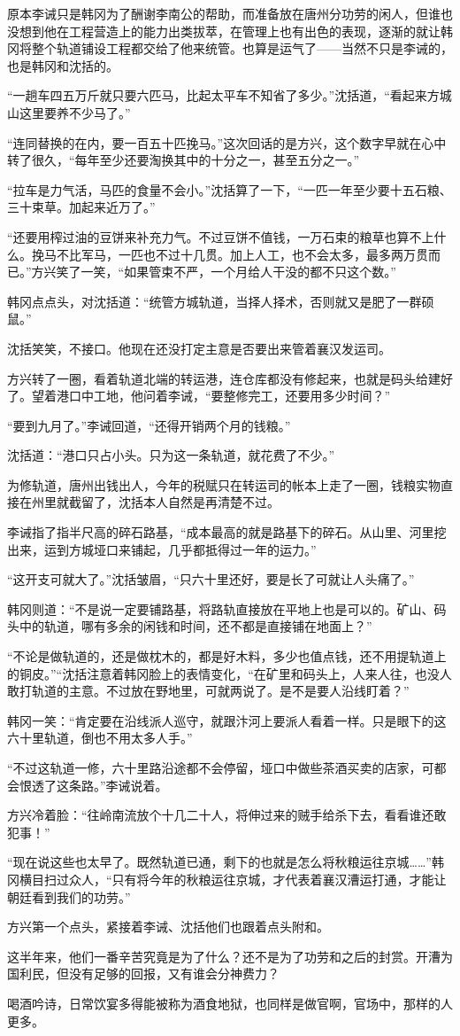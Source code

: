 原本李诫只是韩冈为了酬谢李南公的帮助，而准备放在唐州分功劳的闲人，但谁也没想到他在工程营造上的能力出类拔萃，在管理上也有出色的表现，逐渐的就让韩冈将整个轨道铺设工程都交给了他来统管。也算是运气了——当然不只是李诫的，也是韩冈和沈括的。

“一趟车四五万斤就只要六匹马，比起太平车不知省了多少。”沈括道，“看起来方城山这里要养不少马了。”

“连同替换的在内，要一百五十匹挽马。”这次回话的是方兴，这个数字早就在心中转了很久，“每年至少还要淘换其中的十分之一，甚至五分之一。”

“拉车是力气活，马匹的食量不会小。”沈括算了一下，“一匹一年至少要十五石粮、三十束草。加起来近万了。”

“还要用榨过油的豆饼来补充力气。不过豆饼不值钱，一万石束的粮草也算不上什么。挽马不比军马，一匹也不过十几贯。加上人工，也不会太多，最多两万贯而已。”方兴笑了一笑，“如果管束不严，一个月给人干没的都不只这个数。”

韩冈点点头，对沈括道：“统管方城轨道，当择人择术，否则就又是肥了一群硕鼠。”

沈括笑笑，不接口。他现在还没打定主意是否要出来管着襄汉发运司。

方兴转了一圈，看着轨道北端的转运港，连仓库都没有修起来，也就是码头给建好了。望着港口中工地，他问着李诫，“要整修完工，还要用多少时间？”

“要到九月了。”李诫回道，“还得开销两个月的钱粮。”

沈括道：“港口只占小头。只为这一条轨道，就花费了不少。”

为修轨道，唐州出钱出人，今年的税赋只在转运司的帐本上走了一圈，钱粮实物直接在州里就截留了，沈括本人自然是再清楚不过。

李诫指了指半尺高的碎石路基，“成本最高的就是路基下的碎石。从山里、河里挖出来，运到方城垭口来铺起，几乎都抵得过一年的运力。”

“这开支可就大了。”沈括皱眉，“只六十里还好，要是长了可就让人头痛了。”

韩冈则道：“不是说一定要铺路基，将路轨直接放在平地上也是可以的。矿山、码头中的轨道，哪有多余的闲钱和时间，还不都是直接铺在地面上？”

“不论是做轨道的，还是做枕木的，都是好木料，多少也值点钱，还不用提轨道上的铜皮。”“沈括注意着韩冈脸上的表情变化，“在矿里和码头上，人来人往，也没人敢打轨道的主意。不过放在野地里，可就两说了。是不是要人沿线盯着？”

韩冈一笑：“肯定要在沿线派人巡守，就跟汴河上要派人看着一样。只是眼下的这六十里轨道，倒也不用太多人手。”

“不过这轨道一修，六十里路沿途都不会停留，垭口中做些茶酒买卖的店家，可都会恨透了这条路。”李诫说着。

方兴冷着脸：“往岭南流放个十几二十人，将伸过来的贼手给杀下去，看看谁还敢犯事！”

“现在说这些也太早了。既然轨道已通，剩下的也就是怎么将秋粮运往京城……”韩冈横目扫过众人，“只有将今年的秋粮运往京城，才代表着襄汉漕运打通，才能让朝廷看到我们的功劳。”

方兴第一个点头，紧接着李诫、沈括他们也跟着点头附和。

这半年来，他们一番辛苦究竟是为了什么？还不是为了功劳和之后的封赏。开漕为国利民，但没有足够的回报，又有谁会分神费力？

喝酒吟诗，日常饮宴多得能被称为酒食地狱，也同样是做官啊，官场中，那样的人更多。


